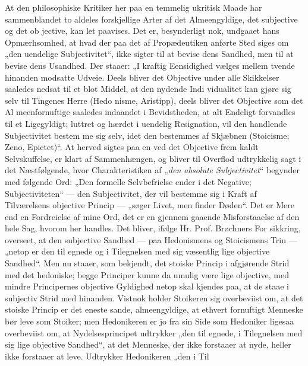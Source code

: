 \documentclass[12pt]{book}
\newcommand{\opage}[1]{\marginnote{\footnotesize\textit{[#1]}}}
\begin{document}
At den philosophiske Kritiker her paa en temmelig
ukritisk Maade har sammenblandet to aldeles forskjellige
Arter af det Almeengyldige, det subjective og det ob\-%
jective, kan let paavises. Det er, besynderligt nok,
undgaaet hans Opmærhsomhed, at hvad der paa det af
Propædeutiken anførte Sted siges om „den uendelige
Subjectivitet“, ikke sigter til at bevise dens Sandhed,
men til at bevise dens Usandhed. Der staaer: „I kraftig
Eensidighed vælges mellem tvende hinanden modsatte
Udveie. Deels bliver det Objective under alle Skikkelser
saaledes nedsat til et blot Middel, at den nydende Indi\-%
vidualitet kan gjøre sig selv til Tingenes Herre (Hedo\-%
nisme, Aristipp), deels bliver det Objective som det Al\-%
meenfornuftige saaledes indaandet i Bevidstheden, at alt
Endeligt forvandles til et Ligegyldigt; luttret og hærdet i
uendelig Resignation, vil den handlende Subjectivitet bestem\-%
me sig selv, idet den bestemmes af Skjæbnen (Stoicisme; Zeno,
Epictet)“. At herved sigtes paa en ved det Objective frem\-%
kaldt Selvskuffelse, er klart af Sammenhængen, og bliver
til Overflod udtrykkelig sagt i det Næstfølgende, hvor
Charakteristiken af „\emph{den absolute Subjectivitet}“
begynder med følgende Ord: „Den formelle Selvbefrielse %
ender i det Negative; Subjectiviteten“ --- den Subjectivitet,
der vil bestemme sig i Kraft af Tilværelsens objective
Princip --- „søger Livet, men finder Døden“. Det er
Mere end en Fordreielse af mine Ord, det er en gjennem\-%
gaaende Misforstaaelse af den hele Sag, hvorom her
\opage{13}\setcounter{footnote}{0}%
handles. Det bliver, ifølge Hr. Prof. Brøchners For\-%
sikkring, overseet, at den subjective Sandhed --- paa
Hedonismens og Stoicismens Trin --- „netop er den til\-%
egnede og i Tilegnelsen med sig væsentlig lige objective
Sandhed“. Men nu staaer, som bekjendt, det stoiske
Princip i afgjørende Strid med det hedoniske; begge
Principer kunne da umulig være lige objective, med
mindre Principernes objective Gyldighed netop skal
kjendes paa, at de staae i subjectiv Strid med hinanden.
Vistnok holder Stoikeren sig overbeviist om, at det
stoiske Princip er det eneste sande, almeengyldige, at
ethvert fornuftigt Menneske bør leve som Stoiker; men
Hedonikeren er jo fra sin Side som Hedoniker ligesaa
overbeviist om, at Nydelsesprincipet udtrykker „den til\-%
egnede, i Tilegnelsen med sig lige objective Sandhed“,
at det Menneske, der ikke forstaaer at nyde, heller ikke
forstaaer at leve. Udtrykker Hedonikeren „den i Til\-%
\end{document}
